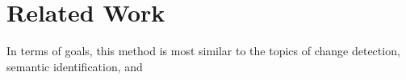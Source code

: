 \section{Related Work}
\label{sec:related_work}

In terms of goals, this method is most similar to the topics of change detection, semantic identification, and 

% 